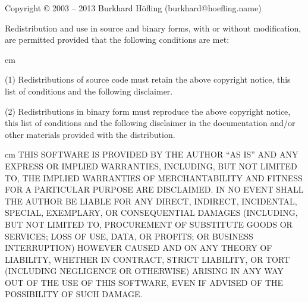 

Copyright © 2003 -- 2013 Burkhard Höfling (burkhard@hoefling.name)

Redistribution and use in source and binary forms, with or without
modification, are permitted provided that the following conditions are
met:

{ em
\item{(1)} Redistributions of source code must retain the above copyright
    notice, this list of conditions and the following disclaimer. 

\item{(2)} Redistributions in binary form must reproduce the above copyright
    notice, this list of conditions and the following disclaimer in
    the documentation and/or other materials provided with the
    distribution. \par}
    
{ cm 
THIS SOFTWARE IS PROVIDED BY THE AUTHOR ``AS IS'' AND ANY EXPRESS OR
IMPLIED WARRANTIES, INCLUDING, BUT NOT LIMITED TO, THE IMPLIED
WARRANTIES OF MERCHANTABILITY AND FITNESS FOR A PARTICULAR PURPOSE ARE
DISCLAIMED. IN NO EVENT SHALL THE AUTHOR BE LIABLE FOR ANY DIRECT,
INDIRECT, INCIDENTAL, SPECIAL, EXEMPLARY, OR CONSEQUENTIAL DAMAGES
(INCLUDING, BUT NOT LIMITED TO, PROCUREMENT OF SUBSTITUTE GOODS OR
SERVICES; LOSS OF USE, DATA, OR PROFITS; OR BUSINESS INTERRUPTION)
HOWEVER CAUSED AND ON ANY THEORY OF LIABILITY, WHETHER IN CONTRACT,
STRICT LIABILITY, OR TORT (INCLUDING NEGLIGENCE OR OTHERWISE) ARISING
IN ANY WAY OUT OF THE USE OF THIS SOFTWARE, EVEN IF ADVISED OF THE
POSSIBILITY OF SUCH DAMAGE.\par}

